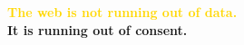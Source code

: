 \documentclass[aspectratio=169,11pt]{beamer}
\begin{document}
{
\begin{frame}[plain]
\vfill
\begin{center}
{\huge\bfseries\textcolor{Gold}{The web is not running out of data.}}\\[0.8cm]
{\huge\bfseries\textcolor{SoftWhite}{It is running out of \alert{consent}.}}
\end{center}
\vfill
\end{frame}}
\end{document}
